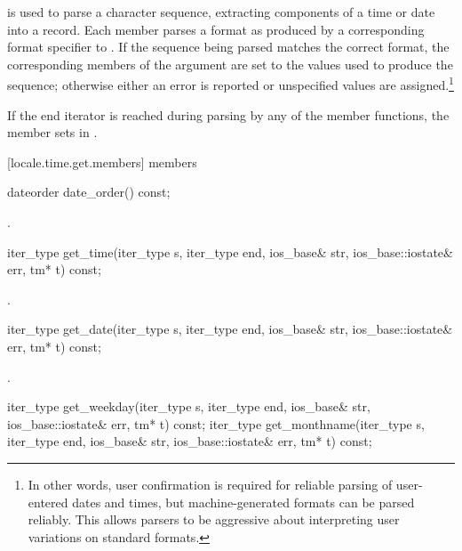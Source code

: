 \pnum
{}
is used to
parse a character sequence, extracting components of a time or date
into a
record.
Each
member parses a format as produced by a corresponding format specifier to
.
If the sequence being parsed matches the correct format, the corresponding
members of the
argument are set to the values used to produce the sequence; otherwise
either an error is reported or unspecified values are assigned.\footnote{In
other words, user confirmation is required for reliable parsing of
user-entered dates and times, but machine-generated formats can be
parsed reliably.
This allows parsers to be aggressive about
interpreting user variations on standard formats.}

\pnum
If the end iterator is reached during parsing by any of the
member functions, the member sets
in .

[locale.time.get.members]{ members}

%
\begin{itemdecl}
dateorder date_order() const;
\end{itemdecl}

\begin{itemdescr}
\pnum
\returns
{}.
\end{itemdescr}

%
\begin{itemdecl}
iter_type get_time(iter_type s, iter_type end, ios_base& str,
                   ios_base::iostate& err, tm* t) const;
\end{itemdecl}

\begin{itemdescr}
\pnum
\returns
{}.
\end{itemdescr}

%
\begin{itemdecl}
iter_type get_date(iter_type s, iter_type end, ios_base& str,
                   ios_base::iostate& err, tm* t) const;
\end{itemdecl}

\begin{itemdescr}
\pnum
\returns
{}.
\end{itemdescr}

%
%
\begin{itemdecl}
iter_type get_weekday(iter_type s, iter_type end, ios_base& str,
                      ios_base::iostate& err, tm* t) const;
iter_type get_monthname(iter_type s, iter_type end, ios_base& str,
                        ios_base::iostate& err, tm* t) const;
\end{itemdecl}

